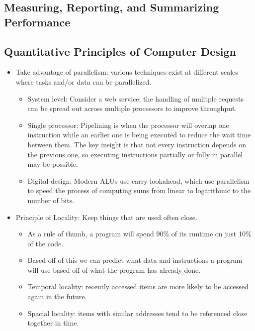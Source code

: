\documentclass[11pt, a4paper]{article}
\theoremstyle{definition}
\theoremstyle{remark}
\begin{document}
\subsection{Measuring, Reporting, and Summarizing Performance}
\subsection{Quantitative Principles of Computer Design}
\begin{itemize}
    \item Take advantage of parallelism: various techniques exist at different scales where tasks and/or data can be parallelized.
    \begin{itemize}
        \item System level: Consider a web service; the handling of mulitple requests can be spread out across multiple processors to improve throughput. 
        \item Single processor: Pipelining is when the processor will overlap one instruction while an earlier one is being executed to reduce the wait time between them. The key insight is that not every instruction depends on the previous one, so executing instructions partially or fully in parallel may be possible.
        \item Digital design: Modern ALUs use carry-lookahead, which use parallelism to speed the process of computing sums from linear to logarithmic to the number of bits.
    \end{itemize}
    \item Principle of Locality: Keep things that are used often close.
    \begin{itemize}
        \item As a rule of thumb, a program will spend 90\% of its runtime on just 10\% of the code.
        \item Based off of this we can predict what data and instructions a program will use based off of what the program has already done.
        \item Temporal locality: recently accessed items are more likely to be accessed again in the future.
        \item Spacial locality: items with similar addresses tend to be referenced close together in time.
    \end{itemize}
\end{itemize}
\end{document}
